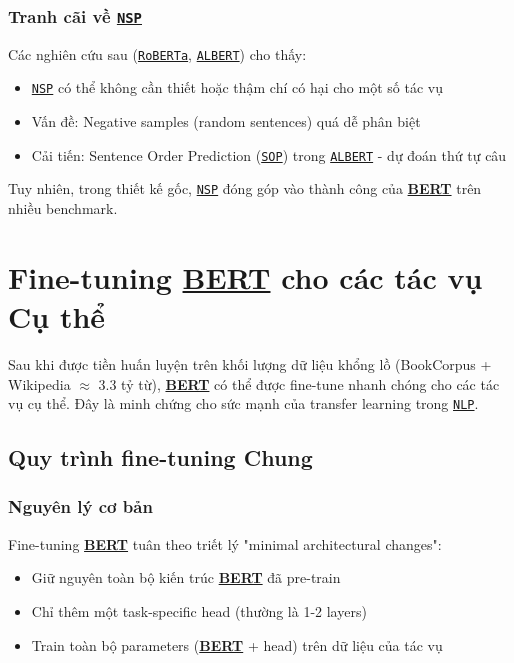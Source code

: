 \subsubsection{Tranh cãi về \hyperref[acro:nsp]{\texttt{NSP}}}
Các nghiên cứu sau (\hyperref[acro:roberta]{\texttt{RoBERTa}}, \hyperref[acro:albert]{\texttt{ALBERT}}) cho thấy:
\begin{itemize}
    \item \hyperref[acro:nsp]{\texttt{NSP}} có thể không cần thiết hoặc thậm chí có hại cho một số tác vụ
    \item Vấn đề: Negative samples (random sentences) quá dễ phân biệt
    \item Cải tiến: Sentence Order Prediction (\hyperref[acro:sop]{\texttt{SOP}}) trong \hyperref[acro:albert]{\texttt{ALBERT}} - dự đoán thứ tự câu
\end{itemize}

Tuy nhiên, trong thiết kế gốc, \hyperref[acro:nsp]{\texttt{NSP}} đóng góp vào thành công của \hyperref[acro:bert]{\textbf{BERT}} trên nhiều benchmark.
\section{Fine-tuning \hyperref[acro:bert]{\textbf{BERT}} cho các tác vụ Cụ thể}
\label{sec:fine_tuning_bert}
Sau khi được tiền huấn luyện trên khối lượng dữ liệu khổng lồ (BookCorpus + Wikipedia $\approx$ 3.3 tỷ từ), \hyperref[acro:bert]{\textbf{BERT}} có thể được fine-tune nhanh chóng cho các tác vụ cụ thể.
Đây là minh chứng cho sức mạnh của transfer learning trong \hyperref[acro:nlp]{\texttt{NLP}}.
\subsection{Quy trình fine-tuning Chung}
\label{ssec:quy_trinh_tinh_chinh}

\subsubsection{Nguyên lý cơ bản}
Fine-tuning \hyperref[acro:bert]{\textbf{BERT}} tuân theo triết lý "minimal architectural changes":
\begin{itemize}
    \item Giữ nguyên toàn bộ kiến trúc \hyperref[acro:bert]{\textbf{BERT}} đã pre-train
    \item Chỉ thêm một task-specific head (thường là 1-2 layers)
    \item Train toàn bộ parameters (\hyperref[acro:bert]{\textbf{BERT}} + head) trên dữ liệu của tác vụ
\end{itemize}

